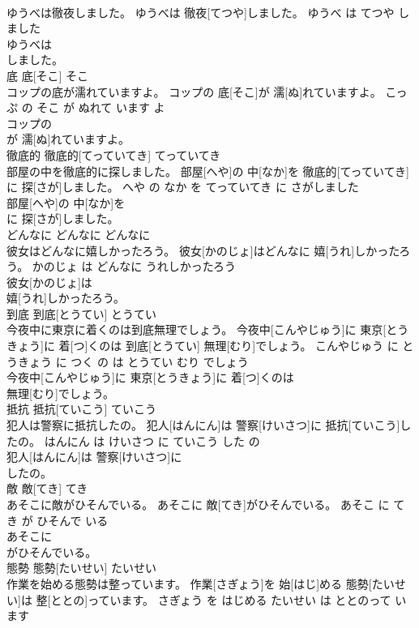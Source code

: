 \documentclass[8pt]{extreport}
\begin{document}
\begin{CJK}{UTF8}{min}
\\	ゆうべは徹夜しました。	ゆうべは 徹夜[てつや]しました。	ゆうべ は てつや しました	
\\	ゆうべは
\\	しました。			
\\	底	底[そこ]	そこ	
\\	コップの底が濡れていますよ。	コップの 底[そこ]が 濡[ぬ]れていますよ。	こっぷ の そこ が ぬれて います よ	
\\	コップの
\\	が 濡[ぬ]れていますよ。			
\\	徹底的	徹底的[てっていてき]	てっていてき	
\\	部屋の中を徹底的に探しました。	部屋[へや]の 中[なか]を 徹底的[てっていてき]に 探[さが]しました。	へや の なか を てっていてき に さがしました	
\\	部屋[へや]の 中[なか]を
\\	に 探[さが]しました。			
\\	どんなに	どんなに	どんなに	
\\	彼女はどんなに嬉しかったろう。	彼女[かのじょ]はどんなに 嬉[うれ]しかったろう。	かのじょ は どんなに うれしかったろう	
\\	彼女[かのじょ]は
\\	嬉[うれ]しかったろう。			
\\	到底	到底[とうてい]	とうてい	
\\	今夜中に東京に着くのは到底無理でしょう。	今夜中[こんやじゅう]に 東京[とうきょう]に 着[つ]くのは 到底[とうてい] 無理[むり]でしょう。	こんやじゅう に とうきょう に つく の は とうてい むり でしょう	
\\	今夜中[こんやじゅう]に 東京[とうきょう]に 着[つ]くのは
\\	無理[むり]でしょう。			
\\	抵抗	抵抗[ていこう]	ていこう	
\\	犯人は警察に抵抗したの。	犯人[はんにん]は 警察[けいさつ]に 抵抗[ていこう]したの。	はんにん は けいさつ に ていこう した の	
\\	犯人[はんにん]は 警察[けいさつ]に
\\	したの。			
\\	敵	敵[てき]	てき	
\\	あそこに敵がひそんでいる。	あそこに 敵[てき]がひそんでいる。	あそこ に てき が ひそんで いる	
\\	あそこに
\\	がひそんでいる。			
\\	態勢	態勢[たいせい]	たいせい	
\\	作業を始める態勢は整っています。	作業[さぎょう]を 始[はじ]める 態勢[たいせい]は 整[ととの]っています。	さぎょう を はじめる たいせい は ととのって います	

\end{CJK}
\end{document}
